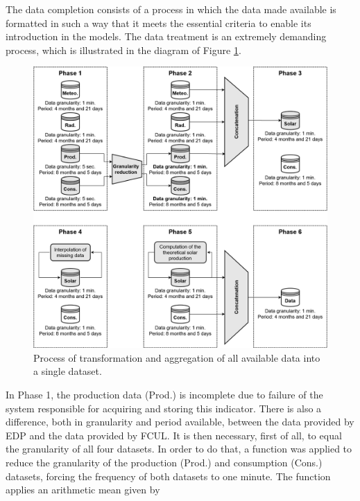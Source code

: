 The data completion consists of a process in which the data made available is formatted in such a way that it meets the essential criteria to enable its introduction in the models. The data treatment is an extremely demanding process, which is illustrated in the diagram of Figure \ref{datatreatment}.

\begin{figure}[h!]
    \centering
    \begin{center}
    \includegraphics[width=1\textwidth]{Images/Data.png}
    \caption{Process of transformation and aggregation of all available data into a single dataset.}
    \label{datatreatment}
    \end{center}
\end{figure}

In Phase 1, the production data (Prod.) is incomplete due to failure of the system responsible for acquiring and storing this indicator. There is also a difference, both in granularity and period available, between the data provided by \ac{EDP} and the data provided by \ac{FCUL}. It is then necessary, first of all, to equal the granularity of all four datasets. In order to do that, a function was applied to reduce the granularity of the production (Prod.) and consumption (Cons.) datasets, forcing the frequency of both datasets to one minute. The function applies an arithmetic mean given by 

